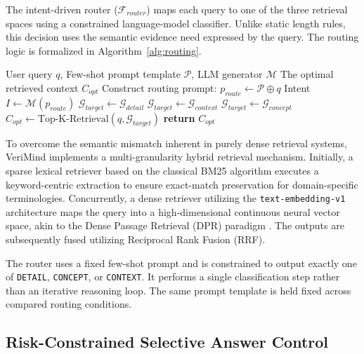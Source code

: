 \documentclass[smallextended]{svjour3}
\begin{document}
The intent-driven router ($\mathcal{F}_{router}$) maps each query to one of the three retrieval spaces using a constrained language-model classifier. Unlike static length rules, this decision uses the semantic evidence need expressed by the query. The routing logic is formalized in Algorithm~\ref{alg:routing}.

\begin{algorithm}[htbp]
\caption{Intent-Driven Multi-Granularity Routing}
\label{alg:routing}
\begin{algorithmic}[1]
\Require User query $q$, Few-shot prompt template $\mathcal{P}$, LLM generator $\mathcal{M}$
\Ensure The optimal retrieved context $C_{opt}$
\State Construct routing prompt: $p_{route} \gets \mathcal{P} \oplus q$
\State Intent $I \gets \mathcal{M}(p_{route})$ 
    \State $\mathcal{G}_{target} \gets \mathcal{G}_{detail}$ 
    \State $\mathcal{G}_{target} \gets \mathcal{G}_{context}$ 
\Else
    \State $\mathcal{G}_{target} \gets \mathcal{G}_{concept}$ 
\EndIf
\State $C_{opt} \gets \text{Top-K-Retrieval}(q, \mathcal{G}_{target})$
\State \textbf{return} $C_{opt}$
\end{algorithmic}
\end{algorithm}

To overcome the semantic mismatch inherent in purely dense retrieval systems, VeriMind implements a multi-granularity hybrid retrieval mechanism. Initially, a sparse lexical retriever based on the classical BM25 algorithm \citep{robertson2009probabilistic} executes a keyword-centric extraction to ensure exact-match preservation for domain-specific terminologies. Concurrently, a dense retriever utilizing the \texttt{text-embedding-v1} architecture maps the query into a high-dimensional continuous neural vector space, akin to the Dense Passage Retrieval (DPR) paradigm \citep{karpukhin2020dense}. The outputs are subsequently fused utilizing Reciprocal Rank Fusion (RRF).

The router uses a fixed few-shot prompt and is constrained to output exactly one of \texttt{DETAIL}, \texttt{CONCEPT}, or \texttt{CONTEXT}. It performs a single classification step rather than an iterative reasoning loop. The same prompt template is held fixed across compared routing conditions.

\subsection{Risk-Constrained Selective Answer Control}
\label{sec:trust_scoring}
\end{document}
